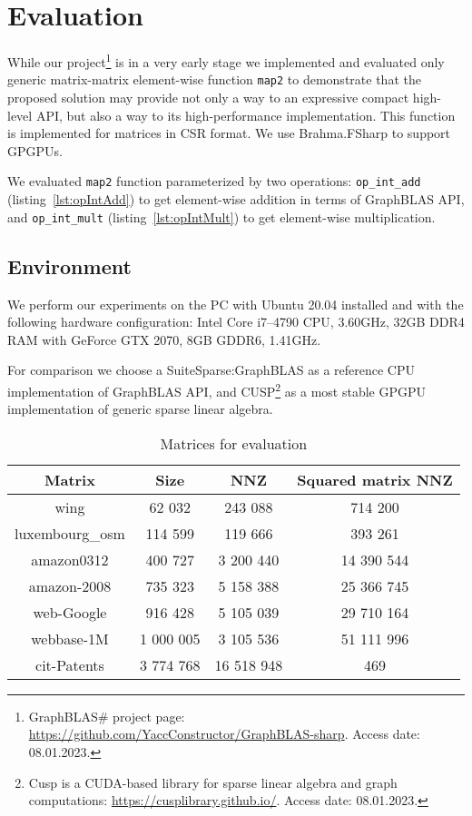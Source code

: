 \section{Evaluation}

While our project\footnote{GraphBLAS\# project page: \url{https://github.com/YaccConstructor/GraphBLAS-sharp}. Access date: 08.01.2023.} is in a very early stage we implemented and evaluated only generic matrix-matrix element-wise function \texttt{map2} to demonstrate that the proposed solution may provide not only a way to an expressive compact high-level API, but also a way to its high-performance implementation. This function is implemented for matrices in CSR format. We use Brahma.FSharp to support GPGPUs.  

We evaluated \texttt{map2} function parameterized by two operations: \texttt{op\_int\_add} (listing~\ref{lst:opIntAdd}) to get element-wise addition in terms of GraphBLAS API, and \texttt{op\_int\_mult} (listing~\ref{lst:opIntMult}) to get element-wise multiplication.

\subsection{Environment}
We perform our experiments on the PC with Ubuntu 20.04 installed and with the following hardware configuration: Intel Core i7--4790 CPU, 3.60GHz, 32GB DDR4 RAM with GeForce GTX 2070, 8GB GDDR6, 1.41GHz.

For comparison we choose a SuiteSparse:GraphBLAS as a reference CPU implementation of GraphBLAS API, and CUSP\footnote{Cusp is a CUDA-based library for sparse linear algebra and graph computations: \url{https://cusplibrary.github.io/}. Access date: 08.01.2023.} as a most stable GPGPU implementation of generic sparse linear algebra.

\begin{table}[H]
    \centering
    \caption{Matrices for evaluation}
    \label{matrices}  
    \begin{tabular}{ | c || c | c | c | }
    \hline
    Matrix & Size & NNZ & Squared matrix NNZ \\ \hline
    \hline
    wing & 62 032 & 243 088 & 714 200 \\ \hline
    luxembourg\_osm & 114 599 & 119 666 & 393 261 \\ \hline
    amazon0312 & 400 727 & 3 200 440 & 14 390 544 \\ \hline
    amazon-2008 & 735 323 & 5 158 388 & 25 366 745 \\ \hline
    web-Google & 916 428 & 5 105 039 & 29 710 164 \\ \hline
    webbase-1M & 1 000 005 & 3 105 536 & 51 111 996 \\ \hline
    cit-Patents & 3 774 768 & 16 518 948 & 469 \\ \hline
    \end{tabular}
\end{table}



